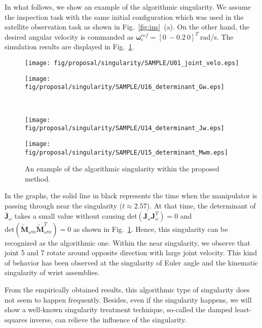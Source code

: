 \documentclass[preprint,12pt]{elsarticle}
\def\fig#1{{Fig.~\ref{fig:#1}}}
\def\unit#1{{~\mathrm{#1}}}
\def\tbm#1{{\tilde{\bbm{#1}}}}
\def\bbm#1{\bm{#1}}
\begin{document}
In what follows, we show an example of the algorithmic singularity.
We assume the inspection task with the same initial configuration
which was used in the satellite observation task as shown in \fig{ins}~(a).
On the other hand, the desired angular velocity is commanded as $\bm{\omega}_{e}^{ref} = [0~-0.2~0]^{T}\unit{rad/s}$.
The simulation results are displayed in \fig{RES_SIN}.
%
\begin{figure}[t]
  \centering
  \begin{minipage}[t]{0.40\linewidth}
    \centering
    \texttt{[image: fig/proposal/singularity/SAMPLE/U01\_joint\_velo.eps]}
  \end{minipage}
  \begin{minipage}[t]{0.40\linewidth}
    \centering
    \texttt{[image: fig/proposal/singularity/SAMPLE/U16\_determinant\_Gw.eps]}
  \end{minipage}\\
  \vspace{-1mm}
  \begin{minipage}[t]{0.40\linewidth}
    \centering
    \texttt{[image: fig/proposal/singularity/SAMPLE/U14\_determinant\_Jw.eps]}
  \end{minipage}
  \begin{minipage}[t]{0.40\linewidth}
    \centering
    \texttt{[image: fig/proposal/singularity/SAMPLE/U15\_determinant\_Mwm.eps]}
  \end{minipage}
  \caption{An example of the algorithmic singularity within the proposed method.}
  \label{fig:RES_SIN}
\end{figure}
%
In the graphs,
the solid line in black represents the time when
the manipulator is passing through near the singularity ($t \approx 2.57$).
At that time, the determinant of $\bar{\bm{J}}_{\omega}$ takes a small value
without causing $\mathrm{det}(\bm{J}_{\omega}\bm{J}_{\omega}^{T}) = 0$ and
$\mathrm{det}(\tbm{M}_{\omega m}\tbm{M}_{\omega m}^{T}) = 0$ as shown in \fig{RES_SIN}.
Hence, this singularity can be recognized as the algorithmic one.
Within the near singularity,
we observe that joint 5 and 7 rotate around opposite direction with large joint velocity.
This kind of behavior has been observed at the singularity of Euler angle \cite{Taki2013}
and the kinematic singularity of wrist assemblies.

From the empirically obtained results,
this algorithmic type of singularity does not seem to happen frequently.
Besides,
even if the singularity happens,
we will show a well-known singularity treatment technique,
so-called the damped least-squares inverse,
can relieve the influence of the singularity.
\end{document}
